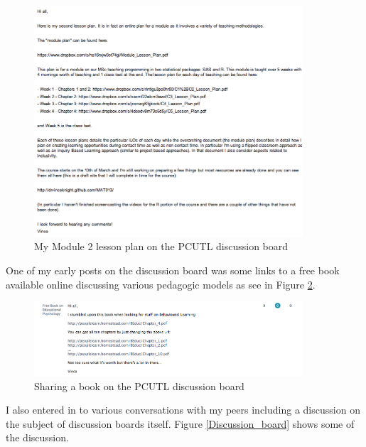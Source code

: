\documentclass[a4paper,12pt]{article}
\begin{document}
\begin{figure}[htdp]
    \begin{center}
        \includegraphics[width=10cm]{./images/Lesson_plan_2}
    \end{center}
    \caption{My Module 2 lesson plan on the PCUTL discussion board}
    \label{Lesson_plan_2}
\end{figure}

One of my early posts on the discussion board was some links to a free book available online discussing various pedagogic models as see in Figure \ref{free_book}.\\

\begin{figure}[htdp]
    \begin{center}
        \includegraphics[width=10cm]{./images/free_book}
    \end{center}
    \caption{Sharing a book on the PCUTL discussion board}
    \label{free_book}
\end{figure}

I also entered in to various conversations with my peers including a discussion on the subject of discussion boards itself. Figure \ref{Discussion_board} shows some of the discussion.\\
\end{document}

